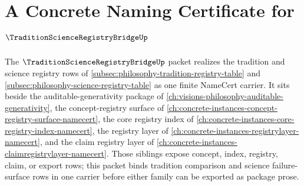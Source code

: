 \chapter{A Concrete Naming Certificate for $\TraditionScienceRegistryBridgeUp$}
\label{ch:concrete-instances-tradition-science-registry-bridge-namecert}

The $\TraditionScienceRegistryBridgeUp$ packet realizes the tradition and science registry rows of \autoref{subsec:philosophy-tradition-registry-table} and \autoref{subsec:philosophy-science-registry-table} as one finite NameCert carrier. It sits beside the auditable-generativity package of \autoref{ch:visions-philosophy-auditable-generativity}, the concept-registry surface of \autoref{ch:concrete-instances-concept-registry-surface-namecert}, the core registry index of \autoref{ch:concrete-instances-core-registry-index-namecert}, the registry layer of \autoref{ch:concrete-instances-registrylayer-namecert}, and the claim registry layer of \autoref{ch:concrete-instances-claimregistrylayer-namecert}. Those siblings expose concept, index, registry, claim, or export rows; this packet binds tradition comparison and science failure-surface rows in one carrier before either family can be exported as package prose.

